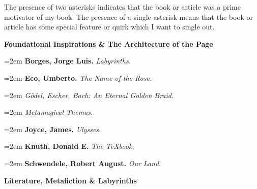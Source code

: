 \backmattertrue

\filler \filler
\startdialogue
\filler \filler
\vfill\eject

\filler \filler
\startdialogue
\filler \filler
\vfill\eject

The presence of two asterisks indicates that the book or article was a prime
motivator of my book. The presence of a single asterisk means that
the book or article has some special feature or quirk which I want to single out.
\par\bigskip

{\bf Foundational Inspirations \& The Architecture of the Page} \par\smallskip

\par\noindent\hangindent=2em {\bf Borges, Jorge Luis.} {\it Labyrinths.} \par
\par\noindent\hangindent=2em {\bf Eco, Umberto.} {\it The Name of the Rose.} \par
\par\noindent\hangindent=2em  {\it Gödel, Escher, Bach: An Eternal Golden Braid.} \par
\par\noindent\hangindent=2em  {\it Metamagical Themas.} \par
\par\noindent\hangindent=2em {\bf Joyce, James.} {\it Ulysses.} \par
\par\noindent\hangindent=2em {\bf Knuth, Donald E.} {\it The TeXbook.} \par
\par\noindent\hangindent=2em {\bf Schwendele, Robert August.} {\it Our Land.} \par

\bigskip
{\bf Literature, Metafiction \& Labyrinths} \par\smallskip

